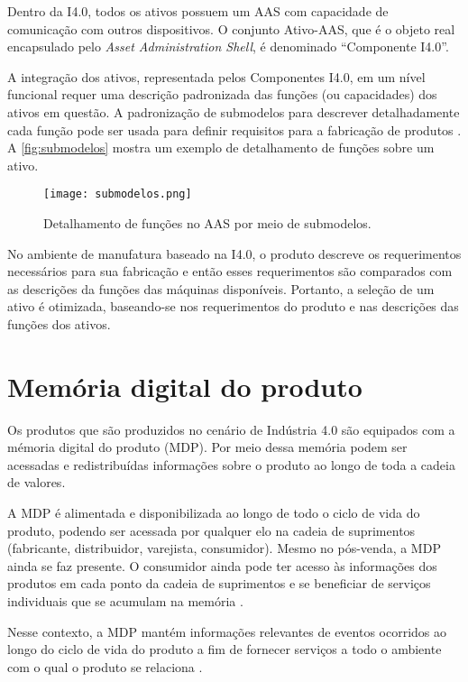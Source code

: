 	Dentro da I4.0, todos os ativos possuem um AAS com capacidade de comunicação com outros dispositivos. O conjunto Ativo-AAS, que é o objeto real encapsulado pelo \textit{Asset Administration Shell}, é denominado ``Componente I4.0''.
	
	A integração dos ativos, representada pelos Componentes I4.0, em um nível funcional requer uma descrição padronizada das funções (ou capacidades) dos ativos em questão. A padronização de submodelos para descrever detalhadamente cada função pode ser usada para definir requisitos para a fabricação de produtos \cite{bedenbender2017aasexamples}. A \autoref{fig:submodelos} mostra um exemplo de detalhamento de funções sobre um ativo.
	
	\begin{figure}[htb]
		\centering
		\caption{Detalhamento de funções no AAS por meio de submodelos.}
		\label{fig:submodelos}
		\texttt{[image: submodelos.png]}
	\end{figure}

	No ambiente de manufatura baseado na I4.0, o produto descreve os requerimentos necessários para sua fabricação e então esses requerimentos são comparados com as descrições da funções das máquinas disponíveis. Portanto, a seleção de um ativo é otimizada, baseando-se nos requerimentos do produto e nas descrições das funções dos ativos.

\section{Memória digital do produto}

	Os produtos que são produzidos no cenário de Indústria 4.0 são equipados com a mémoria digital do produto (MDP). Por meio dessa memória podem ser acessadas e redistribuídas informações sobre o produto ao longo de toda a cadeia de valores.

	A MDP é alimentada e disponibilizada ao longo de todo o ciclo de vida do produto, podendo ser acessada por qualquer elo na cadeia de suprimentos (fabricante, distribuidor, varejista, consumidor). Mesmo no pós-venda, a MDP ainda se faz presente. O consumidor ainda pode ter acesso às informações dos produtos em cada ponto da cadeia de suprimentos e se beneficiar de serviços individuais que se acumulam na memória \cite{brandherm2011productmemory}.

	Nesse contexto, a MDP mantém informações relevantes de eventos ocorridos ao longo do ciclo de vida do produto a fim de fornecer serviços a todo o ambiente com o qual o produto se relaciona \cite{brandherm2011productmemory}.
	
